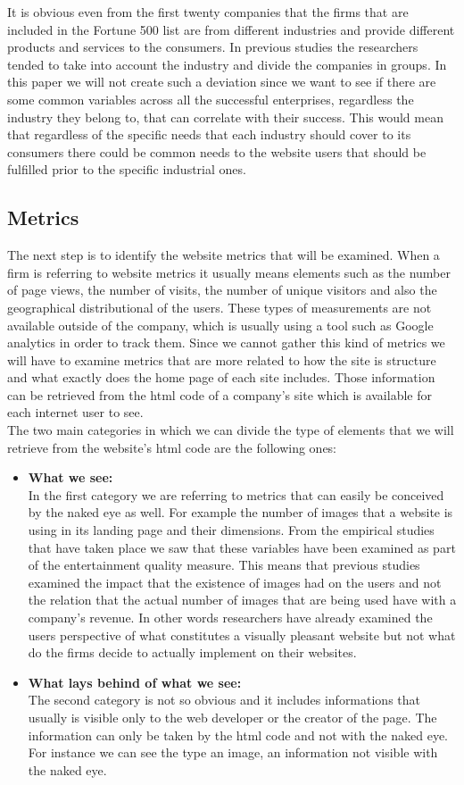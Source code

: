 \documentclass{article}
\begin{document}
It is obvious even from the first twenty companies that the firms that are included in the Fortune 500 list are from different industries and provide different products and services to the consumers. In previous studies the researchers tended to take into account the industry and divide the companies in groups. In this paper we will not create such a deviation since we want to see if there are some common variables across all the successful enterprises, regardless the industry they belong to, that can correlate with their success. This would mean that regardless of the specific needs that each industry should cover to its consumers there could be common needs to the website users that should be fulfilled prior to the specific industrial ones.
\newpage
\subsection{Metrics}
The next step is to identify the website metrics that will be examined. When a firm is referring to website metrics it usually means elements such as the number of page views, the number of visits, the number of unique visitors and also the geographical distributional of the users. These types of measurements are not available outside of the company, which is usually using a tool such as Google analytics\cite{key36} in order to track them. Since we cannot gather this kind of metrics we will have to examine metrics that are more related to how the site is structure and what exactly does the home page of each site includes. Those information can be retrieved from the html code of a company's site which is available for each internet user to see.\\
The two main categories in which we can divide the type of elements that we will retrieve from the website's html code are the following ones:
\begin{itemize}
\item \textbf{What we see:}\\
In the first category we are referring to metrics that can easily be conceived by the naked eye as well. For example the number of images that a website is using in its landing page and their dimensions. From the empirical studies that have taken place we saw that these variables have been examined as part of the entertainment quality measure. This means that previous studies examined the impact that the existence of images had on the users and not the relation that the actual number of images that are being used have with a company's revenue. In other words researchers have already examined the users perspective of what constitutes a visually pleasant website but not what do the firms decide to actually implement on their websites.
\item \textbf{What lays behind of what we see:}\\
The second category is not so obvious and it includes informations that usually is visible only to the web developer or the creator of the page. The information can only be taken by the html code and not with the naked eye. For instance we can see the type an image, an information not visible with the naked eye.
\end{itemize}
\end{document}
